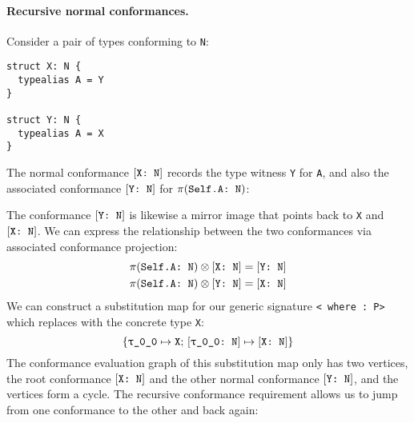 \documentclass[../generics]{subfiles}
\begin{document}
\paragraph{Recursive normal conformances.} Consider a pair of types conforming to \texttt{N}:
\begin{Verbatim}
struct X: N {
  typealias A = Y
}

struct Y: N {
  typealias A = X
}
\end{Verbatim}
The normal conformance $[\texttt{X:~N}]$ records the type witness \verb|Y| for \verb|A|, and also the associated conformance $[\texttt{Y:~N}]$ for $\pi(\texttt{Self.A:~N})$:
\begin{quote}
\end{quote}
The conformance $[\texttt{Y:~N}]$ is likewise a mirror image that points back to \verb|X| and $[\texttt{X:~N}]$. We can express the relationship between the two conformances via associated conformance projection:
\begin{gather*}
\pi(\texttt{Self.A:~N}) \otimes [\texttt{X:~N}] = [\texttt{Y:~N}]\\
\pi(\texttt{Self.A:~N}) \otimes [\texttt{Y:~N}] = [\texttt{X:~N}]
\end{gather*}
%
%
We can construct a substitution map for our generic signature \texttt{< where :\ P>} which replaces  with the concrete type \texttt{X}:
\[\{\texttt{\texttt{$\uptau$\_0\_0}} \mapsto \texttt{X};\,[\texttt{\texttt{$\uptau$\_0\_0}:~N}] \mapsto [\texttt{X:~N}]\}\]
The conformance evaluation graph of this substitution map only has two vertices, the root conformance $[\texttt{X:~N}]$ and the other normal conformance $[\texttt{Y:~N}]$, and the vertices form a cycle. The recursive conformance requirement allows us to jump from one conformance to the other and back again:
\begin{quote}
\end{quote}
\end{document}
